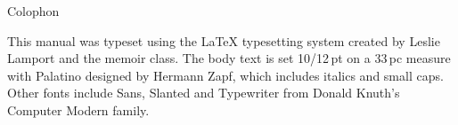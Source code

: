 \documentclass[10pt,a4paper,oneside,extrafontsizes]{memoir}%
\newcommand\U[2]{\textrm{#1}\,\textrm{#2}}
\begin{document}

\printindex



\cleardoublepage
\pagestyle{empty}
\null\vfil

\begin{adjustwidth}{1in}{1in}
\begin{center}
{\Large\textsf{Colophon}}
\end{center}
\begin{center}
This manual was typeset using the LaTeX typesetting system
created by Leslie Lamport and the memoir class. 
The body text is set 10/\U{12}{pt} on a
\U{33}{pc} measure with Palatino designed by Hermann Zapf, which includes 
italics and small caps. Other fonts include
Sans, Slanted and Typewriter from Donald Knuth's 
Computer Modern family.

\end{center}

\end{adjustwidth}

\vfil
\end{document}
